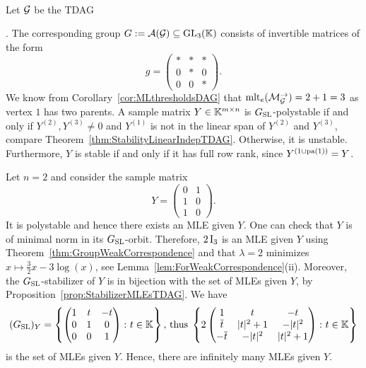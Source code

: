 \begin{example} \label{ex:TDAGnullconeNotZariskiClosed}
	\ \\
	Let $\mathcal{G}$ be the TDAG
	. The corresponding group $G := \mathcal{A}(\mathcal{G}) \subseteq \operatorname{GL}_3(\mathbb K)$ consists of invertible matrices of the form
	\[ g = \begin{pmatrix} * & * & * \\ 0 & * & 0 \\ 0 & 0 & * \end{pmatrix}.
	\]
	We know from Corollary~\ref{cor:MLthresholdsDAG} that $\operatorname{mlt}_e(\mathcal{M}_{\mathcal{G}}^{\to}) = 2 + 1 = 3$ as vertex $1$ has two parents.
	A sample matrix $Y \in \mathbb K^{m \times n}$ is $G_{\operatorname{SL}}$-polystable if and only if $Y^{(2)}, Y^{(3)} \neq 0$ and $Y^{(1)}$ is not in the linear span of $Y^{(2)}$ and $Y^{(3)}$, compare Theorem~\ref{thm:StabilityLinearIndepTDAG}. Otherwise, it is unstable. Furthermore, $Y$ is stable if and only if it has full row rank, since $Y^{(1 \cup \operatorname{pa}(1))} = Y$.
	
	Let $n=2$ and consider the sample matrix
	\[ Y = \begin{pmatrix} 0 & 1  \\ 1 & 0 \\ 1 & 0 \end{pmatrix} . \]
	It is polystable and hence there exists an MLE given $Y$. One can check that $Y$ is of minimal norm in its $G_{\operatorname{SL}}$-orbit. Therefore, $2 \operatorname{I}_3$ is an MLE given $Y$ using Theorem~\ref{thm:GroupWeakCorrespondence} and that $\lambda = 2$ minimizes $x \mapsto \frac{3}{2} x - 3 \log(x)$, see Lemma~\ref{lem:ForWeakCorrespondence}(ii).
	Moreover, the $G_{\operatorname{SL}}$-stabilizer of $Y$ is in bijection with the set of MLEs given $Y$, by Proposition~\ref{prop:StabilizerMLEsTDAG}. We have
	\[ 
	(G_{\operatorname{SL}})_Y = \left\lbrace \begin{pmatrix} 1 & t & -t \\ 0 & 1 & 0 \\ 0 & 0 & 1 \end{pmatrix} \colon t \in \mathbb K \right\rbrace
	\text{, thus} \;
	\left\lbrace 2 \begin{pmatrix} 1 & t & -t \\ \overline{t} & |t|^2 + 1 & - |t|^2 \\ - \overline{t} & - |t|^2 & |t|^2 + 1 \end{pmatrix} \colon t \in \mathbb K \right\rbrace
	 \]
	is the set of MLEs given $Y$. Hence, there are infinitely many MLEs given $Y$.
	\hfill\exSymbol
\end{example}

